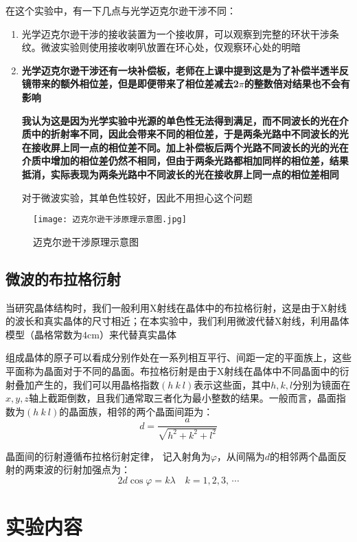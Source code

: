 \documentclass[11pt]{article}
\begin{document}
	在这个实验中，有一下几点与光学迈克尔逊干涉不同：
	\begin{enumerate}
		\item 光学迈克尔逊干涉的接收装置为一个接收屏，可以观察到完整的环状干涉条纹。微波实验则使用接收喇叭放置在环心处，仅观察环心处的明暗
		\item \textbf{光学迈克尔逊干涉还有一块补偿板，老师在上课中提到这是为了补偿半透半反镜带来的额外相位差，但是即便带来了相位差减去2$\pi$的整数倍对结果也不会有影响}
		
		\textbf{我认为这是因为光学实验中光源的单色性无法得到满足，而不同波长的光在介质中的折射率不同，因此会带来不同的相位差，于是两条光路中不同波长的光在接收屏上同一点的相位差不同。加上补偿板后两个光路不同波长的光的光在介质中增加的相位差仍然不相同，但由于两条光路都相加同样的相位差，结果抵消，实际表现为两条光路中不同波长的光在接收屏上同一点的相位差相同}
		
		对于微波实验，其单色性较好，因此不用担心这个问题
	\end{enumerate}
	\begin{figure}[htbp]
		\centering
		\texttt{[image: 迈克尔逊干涉原理示意图.jpg]}
		\caption{迈克尔逊干涉原理示意图}
		\label{fig:迈克尔逊干涉原理示意图}
	\end{figure}
	
	\subsection{微波的布拉格衍射}
	当研究晶体结构时，我们一般利用X射线在晶体中的布拉格衍射，这是由于X射线的波长和真实晶体的尺寸相近；在本实验中，我们利用微波代替X射线，利用晶体模型（晶格常数为$4$cm）来代替真实晶体
	
	组成晶体的原子可以看成分别作处在一系列相互平行、间距一定的平面族上，这些平面称为晶面对于不同的晶面。布拉格衍射是由于X射线在晶体中不同晶面中的衍射叠加产生的，我们可以用晶格指数$(h\ k\ l)$表示这些面，其中$h,k,l$分别为镜面在$x,y,z$轴上截距倒数，且我们通常取三者化为最小整数的结果。一般而言，晶面指数为$(h\ k\ l)$的晶面族，相邻的两个晶面间距为：
	\[
	d=\frac{a}{\sqrt{h^2+k^2+l^2}}
	\]
	
	晶面间的衍射遵循布拉格衍射定律，	记入射角为$\varphi$，从间隔为$d$的相邻两个晶面反射的两束波的衍射加强点为：
	\[
	2d\cos{\varphi} = k{\lambda}\quad k = 1,2,3,\,\cdots
	\]
	
	
	
	\section{实验内容}
	
\end{document}
